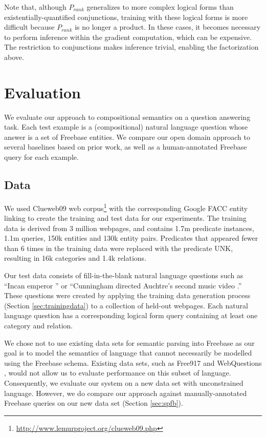 \documentclass[11pt]{article}
\newcommand{\pred}[1]{\textsc{#1}}
\begin{document}
Note that, although $P_{rank}$ generalizes to more complex logical
forms than existentially-quantified conjunctions, training with these
logical forms is more difficult because $P_{rank}$ is no longer a
product. In these cases, it becomes necessary to perform inference
within the gradient computation, which can be expensive. The
restriction to conjunctions makes inference trivial, enabling the
factorization above.


\section{Evaluation}
\label{sec:evaluation}

We evaluate our approach to compositional semantics on a question
answering task. Each test example is a (compositional) natural
language question whose answer is a set of Freebase entities. We
compare our open domain approach to several baselines based on prior
work, as well as a human-annotated Freebase query for each example.

\subsection{Data}

We used Clueweb09 web
corpus\footnote{\url{http://www.lemurproject.org/clueweb09.php}} with the
corresponding Google FACC entity linking \cite{gabrilovich2013} to
create the training and test data for our experiments. The training
data is derived from 3 million webpages, and contains 1.7m predicate
instances, 1.1m queries, 150k entities and 130k entity
pairs. Predicates that appeared fewer than 6 times in the training
data were replaced with the predicate \pred{UNK}, resulting in 16k
categories and 1.4k relations.

Our test data consists of fill-in-the-blank natural language questions
such as ``Incan emperor \underline{\quad{}}'' or ``Cunningham directed
Auchtre's second music video \underline{\quad{}}.'' These questions
were created by applying the training data generation process (Section
\ref{sec:trainingdata}) to a collection of held-out webpages. Each
natural language question has a corresponding logical form query
containing at least one category and relation.

We chose not to use existing data sets for semantic parsing into
Freebase as our goal is to model the semantics of language that cannot
necessarily be modelled using the Freebase schema. Existing data sets,
such as Free917 \cite{cai2013acl} and WebQuestions \cite{berant2013},
would not allow us to evaluate performance on this subset of
language. Consequently, we evaluate our system on a new data set with
unconstrained language. However, we do compare our approach against
manually-annotated Freebase queries on our new data set (Section
\ref{sec:spfb}).
\end{document}
